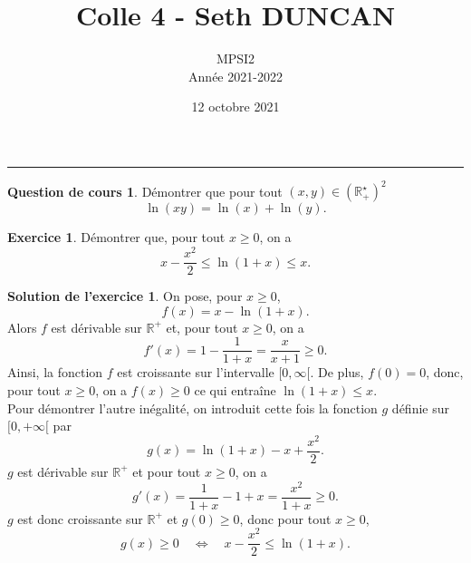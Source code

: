 \documentclass[a4paper, 11pt,openany]{article}%
\title{Colle 4 - Seth DUNCAN}
\author{MPSI2\\
Année 2021-2022}
\date{12 octobre 2021}
\theoremstyle{plain}
\theoremstyle{definition}
\newtheorem{cours}{Question de cours}
\newtheorem{exo}{Exercice}
\newtheorem{sol}{Solution de l'exercice}
\theoremstyle{remark}
\newcommand{\R}{\mathbb{R}}
\begin{document}
   \maketitle
      \rule{\linewidth}{0.5mm}


\begin{cours}
Démontrer que pour tout $(x,y) \in (\R_+^{\star})^2$
\[ \ln(xy ) = \ln(x) + \ln(y).\]
\end{cours}

\begin{exo}
Démontrer que, pour tout $x \geqslant 0$, on a
\[  x- \frac{x^2}{2} \leqslant \ln(1+x) \leqslant x.\]
\end{exo}

\begin{sol}
On pose, pour $x \geqslant 0$, 
\[ f(x)= x- \ln(1+x).\]
Alors $f$ est dérivable sur $\R^+$ et, pour tout $x \geqslant 0$, on a 
\[ f'(x)=1- \frac{1}{1+x} = \frac{x}{x+1} \geqslant 0.\] Ainsi, la fonction $f$ est croissante sur l'intervalle $[0, \infty [$. De plus, $f(0)=0$, donc, pour tout $x \geqslant 0$, on a $f(x) \geqslant 0$ ce qui entraîne $\ln(1+x)\leqslant x$.\\
Pour démontrer l'autre inégalité, on introduit cette fois la fonction $g$ définie sur $[0,+\infty[$ par 
\[g(x)=\ln(1+x)-x+ \frac{x^2}{2}.\]
$g$ est dérivable sur $\R^+$ et pour tout $x \geqslant 0$, on a
\[ g'(x)=\frac{1}{1+x}-1+x= \frac{x^2}{1+x} \geqslant 0.\]
$g$ est donc croissante sur $\R^+$ et $g(0)\geqslant 0$, donc pour tout $x \geqslant 0$, 
\[ g(x) \geqslant 0 \quad \Leftrightarrow \quad  x- \frac{x^2}{2} \leqslant \ln(1+x).\]
\end{sol}
\end{document}

